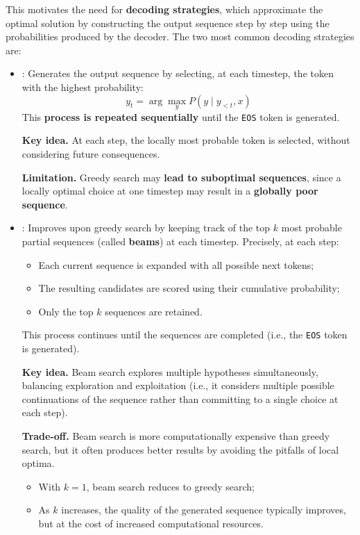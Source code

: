 \highspace
This motivates the need for \textbf{decoding strategies}, which approximate the optimal solution by constructing the output sequence step by step using the probabilities produced by the decoder. The two most common decoding strategies are:
\begin{itemize}
    \item {}: Generates the output sequence by selecting, at each timestep, the token with the highest probability:
    \begin{equation*}
        y_t = \arg\max_{y} P\left(y \mid y_{<t}, x\right)
    \end{equation*}
    This \textbf{process is repeated sequentially} until the \texttt{EOS} token is generated.

    \textcolor{Green3}{ \textbf{Key idea.}} At each step, the locally most probable token is selected, without considering future consequences.

    \textcolor{Red2}{ \textbf{Limitation.}} Greedy search may \textbf{lead to suboptimal sequences}, since a locally optimal choice at one timestep may result in a \textbf{globally poor sequence}.


    \item {}: Improves upon greedy search by keeping track of the top $k$ most probable partial sequences (called \textbf{beams}) at each timestep. Precisely, at each step:
    \begin{itemize}
        \item Each current sequence is expanded with all possible next tokens;
        \item The resulting candidates are scored using their cumulative probability;
        \item Only the top $k$ sequences are retained.
    \end{itemize}
    This process continues until the sequences are completed (i.e., the \texttt{EOS} token is generated).

    \textcolor{Green3}{ \textbf{Key idea.}} Beam search explores multiple hypotheses simultaneously, balancing exploration and exploitation (i.e., it considers multiple possible continuations of the sequence rather than committing to a single choice at each step).

    \textcolor{Green3}{ \textbf{Trade-off.}} Beam search is more computationally expensive than greedy search, but it often produces better results by avoiding the pitfalls of local optima.
    \begin{itemize}
        \item With $k=1$, beam search reduces to greedy search;
        \item As $k$ increases, the quality of the generated sequence typically improves, but at the cost of increased computational resources.
    \end{itemize}
\end{itemize}

